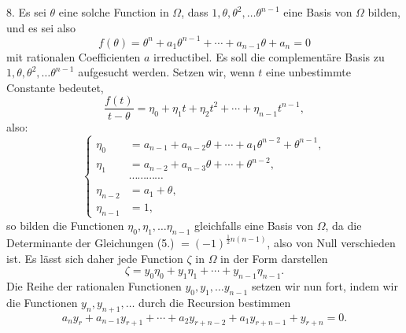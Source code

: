 \documentclass{article}
\begin{document}
8. Es sei $\theta$ eine solche Function in $\Omega$, dass $1, \theta, \theta^{2}, \ldots \theta^{n-1}$ eine Basis von $\Omega$ bilden, und es sei also
\[ f(\theta) = \theta^{n} + a_{1}\theta^{n-1} + \cdots + a_{n-1}\theta + a_{n} = 0 \tag{4.} \]
mit rationalen Coefficienten $a$ irreductibel. Es soll die complementäre Basis zu $1, \theta, \theta^{2}, \ldots \theta^{n-1}$ aufgesucht werden. Setzen wir, wenn $t$ eine unbestimmte Constante bedeutet,
\[ \frac{f(t)}{t-\theta} = \eta_{0} + \eta_{1}t + \eta_{2}t^{2} + \cdots + \eta_{n-1}t^{n-1}, \]
also:
\[ \left\{ \begin{aligned} \eta_{0} &= a_{n-1} + a_{n-2}\theta + \cdots + a_{1}\theta^{n-2} + \theta^{n-1}, \\ \eta_{1} &= a_{n-2} + a_{n-3}\theta + \cdots + \theta^{n-2}, \\ &\cdots\cdots\cdots\cdots \\ \eta_{n-2} &= a_{1} + \theta, \\ \eta_{n-1} &= 1, \end{aligned} \right. \tag{5.} \]
so bilden die Functionen $\eta_{0}, \eta_{1}, \ldots \eta_{n-1}$ gleichfalls eine Basis von $\Omega$, da die Determinante der Gleichungen (5.) $= (-1)^{\frac{1}{2}n(n-1)}$, also von Null verschieden ist. Es lässt sich daher jede Function $\zeta$ in $\Omega$ in der Form darstellen
\[ \zeta = y_{0}\eta_{0} + y_{1}\eta_{1} + \cdots + y_{n-1}\eta_{n-1}. \]
Die Reihe der rationalen Functionen $y_{0}, y_{1}, \ldots y_{n-1}$ setzen wir nun fort, indem wir die Functionen $y_{n}, y_{n+1}, \ldots$ durch die Recursion bestimmen
\[ a_{n}y_{r} + a_{n-1}y_{r+1} + \cdots + a_{2}y_{r+n-2} + a_{1}y_{r+n-1} + y_{r+n} = 0. \tag{6.} \]
\end{document}
